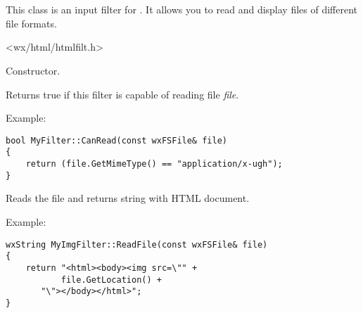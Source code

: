 %
%

\section{}\label{wxhtmlfilter}

This class is an input filter for .
It allows you to read and display files of different file formats.




<wx/html/htmlfilt.h>





\label{wxhtmlfilterwxhtmlfilter}


Constructor.

\label{wxhtmlfiltercanread}


Returns true if this filter is capable of reading file {\it file}.

Example:

\begin{verbatim}
bool MyFilter::CanRead(const wxFSFile& file)
{
    return (file.GetMimeType() == "application/x-ugh");
}
\end{verbatim}

\label{wxhtmlfilterreadfile}


Reads the file and returns string with HTML document.

Example:

\begin{verbatim}
wxString MyImgFilter::ReadFile(const wxFSFile& file)
{
    return "<html><body><img src=\"" +
           file.GetLocation() +
	   "\"></body></html>";
}
\end{verbatim}

